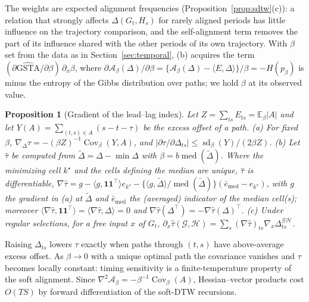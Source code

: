 \documentclass[12pt]{article}
\newtheorem{proposition}{Proposition}
\theoremstyle{definition}
\begin{document}
The weights are expected alignment frequencies (Proposition~\ref{prop:sdtw}(c)): a relation that strongly affects $\Delta(G_t,H_s)$ for rarely aligned periods has little influence on the trajectory comparison, and the self-alignment term removes the part of its influence shared with the other periods of its own trajectory. With $\beta$ set from the data as in Section~\ref{sec:temporal}, (b) acquires the term $(\partial\widehat{\mathrm{GSTA}}/\partial\beta)\,\partial_x\beta$, where $\partial\mathcal A_\beta(\Delta)/\partial\beta=\{\mathcal A_\beta(\Delta)-\langle E,\Delta\rangle\}/\beta=-H(p_\beta)$ is minus the entropy of the Gibbs distribution over paths; we hold $\beta$ at its observed value.

\begin{proposition}[Gradient of the lead--lag index]\label{prop:gradll}
Let $Z=\sum_{ts}E_{ts}=\mathbb E_\beta|A|$ and let $Y(A)=\sum_{(t,s)\in A}(s-t-\tau)$ be the excess offset of a path.
(a) For fixed $\beta$, $\nabla_\Delta\tau=-(\beta Z)^{-1}\operatorname{Cov}_\beta(Y,A)$, and $|\partial\tau/\partial\Delta_{ts}|\le\operatorname{sd}_\beta(Y)/(2\beta Z)$.
(b) Let $\hat\tau$ be computed from $\tilde\Delta=\Delta-\min\Delta$ with $\beta=b\operatorname{med}(\tilde\Delta)$. Where the minimizing cell $k^\star$ and the cells defining the median are unique, $\hat\tau$ is differentiable,
$\nabla\hat\tau=g-\langle g,\mathbf 1\mathbf 1^\top\rangle e_{k^\star}-\{\langle g,\tilde\Delta\rangle/\operatorname{med}(\tilde\Delta)\}(\bar e_{\mathrm{med}}-e_{k^\star})$,
with $g$ the gradient in (a) at $\tilde\Delta$ and $\bar e_{\mathrm{med}}$ the (averaged) indicator of the median cell(s); moreover $\langle\nabla\hat\tau,\mathbf 1\mathbf 1^\top\rangle=\langle\nabla\hat\tau,\Delta\rangle=0$ and $\nabla\hat\tau(\Delta^\top)=-\nabla\hat\tau(\Delta)^\top$.
(c) Under regular selections, for a free input $x$ of $G_t$, $\partial_x\hat\tau(\mathcal G,\mathcal H)=\sum_s(\nabla\hat\tau)_{ts}\nabla_x\Delta^{\mathcal{GH}}_{ts}$.
\end{proposition}

Raising $\Delta_{ts}$ lowers $\tau$ exactly when paths through $(t,s)$ have above-average excess offset. As $\beta\to0$ with a unique optimal path the covariance vanishes and $\tau$ becomes locally constant: timing sensitivity is a finite-temperature property of the soft alignment. Since $\nabla^2\mathcal A_\beta=-\beta^{-1}\operatorname{Cov}_\beta(A)$, Hessian--vector products cost $O(TS)$ by forward differentiation of the soft-DTW recursions.
\end{document}
